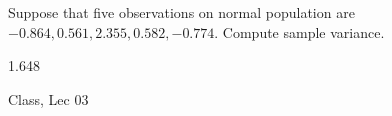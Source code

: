 \begin{samepage}
\begin{ex}
Suppose that five observations on normal population are \\
$-0.864, 0.561, 2.355, 0.582, -0.774$.
Compute sample variance.
\end{ex}
\begin{ans}
1.648
\end{ans}
\begin{source}
Class, Lec 03
\end{source}
\end{samepage}
